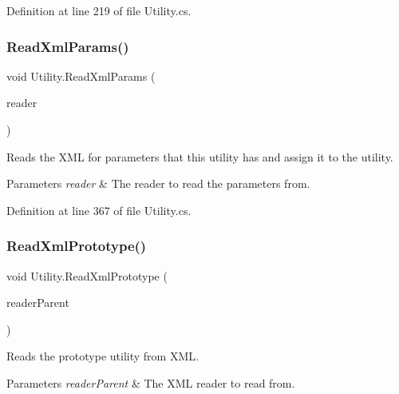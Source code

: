 Definition at line 219 of file Utility.\+cs.

\mbox{\label{class_utility_a7c02fda89553fa462d1cbaa78803ece3}} 
\subsubsection{\texorpdfstring{Read\+Xml\+Params()}{ReadXmlParams()}}
{\footnotesize\ttfamily void Utility.\+Read\+Xml\+Params (\begin{DoxyParamCaption}\item[{Xml\+Reader}]{reader }\end{DoxyParamCaption})}



Reads the X\+ML for parameters that this utility has and assign it to the utility. 


\begin{DoxyParams}{Parameters}
{\em reader} & The reader to read the parameters from.\\
\hline
\end{DoxyParams}


Definition at line 367 of file Utility.\+cs.

\mbox{\label{class_utility_a4ad3d6bda3c087221a7ec2a5a309d79e}} 
\subsubsection{\texorpdfstring{Read\+Xml\+Prototype()}{ReadXmlPrototype()}}
{\footnotesize\ttfamily void Utility.\+Read\+Xml\+Prototype (\begin{DoxyParamCaption}\item[{Xml\+Reader}]{reader\+Parent }\end{DoxyParamCaption})}



Reads the prototype utility from X\+ML. 


\begin{DoxyParams}{Parameters}
{\em reader\+Parent} & The X\+ML reader to read from.\\
\hline
\end{DoxyParams}


